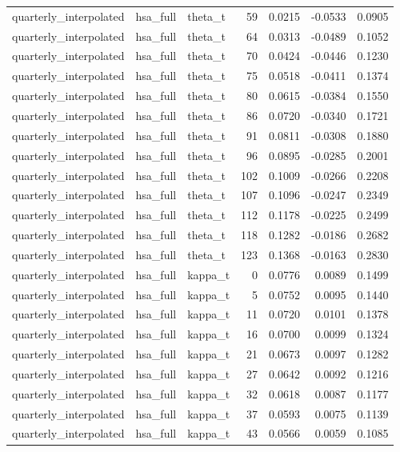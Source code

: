\begin{tabular}{lllrrrr}
quarterly\_interpolated & hsa\_full & theta\_t & 59 & 0.0215 & -0.0533 & 0.0905 \\
quarterly\_interpolated & hsa\_full & theta\_t & 64 & 0.0313 & -0.0489 & 0.1052 \\
quarterly\_interpolated & hsa\_full & theta\_t & 70 & 0.0424 & -0.0446 & 0.1230 \\
quarterly\_interpolated & hsa\_full & theta\_t & 75 & 0.0518 & -0.0411 & 0.1374 \\
quarterly\_interpolated & hsa\_full & theta\_t & 80 & 0.0615 & -0.0384 & 0.1550 \\
quarterly\_interpolated & hsa\_full & theta\_t & 86 & 0.0720 & -0.0340 & 0.1721 \\
quarterly\_interpolated & hsa\_full & theta\_t & 91 & 0.0811 & -0.0308 & 0.1880 \\
quarterly\_interpolated & hsa\_full & theta\_t & 96 & 0.0895 & -0.0285 & 0.2001 \\
quarterly\_interpolated & hsa\_full & theta\_t & 102 & 0.1009 & -0.0266 & 0.2208 \\
quarterly\_interpolated & hsa\_full & theta\_t & 107 & 0.1096 & -0.0247 & 0.2349 \\
quarterly\_interpolated & hsa\_full & theta\_t & 112 & 0.1178 & -0.0225 & 0.2499 \\
quarterly\_interpolated & hsa\_full & theta\_t & 118 & 0.1282 & -0.0186 & 0.2682 \\
quarterly\_interpolated & hsa\_full & theta\_t & 123 & 0.1368 & -0.0163 & 0.2830 \\
quarterly\_interpolated & hsa\_full & kappa\_t & 0 & 0.0776 & 0.0089 & 0.1499 \\
quarterly\_interpolated & hsa\_full & kappa\_t & 5 & 0.0752 & 0.0095 & 0.1440 \\
quarterly\_interpolated & hsa\_full & kappa\_t & 11 & 0.0720 & 0.0101 & 0.1378 \\
quarterly\_interpolated & hsa\_full & kappa\_t & 16 & 0.0700 & 0.0099 & 0.1324 \\
quarterly\_interpolated & hsa\_full & kappa\_t & 21 & 0.0673 & 0.0097 & 0.1282 \\
quarterly\_interpolated & hsa\_full & kappa\_t & 27 & 0.0642 & 0.0092 & 0.1216 \\
quarterly\_interpolated & hsa\_full & kappa\_t & 32 & 0.0618 & 0.0087 & 0.1177 \\
quarterly\_interpolated & hsa\_full & kappa\_t & 37 & 0.0593 & 0.0075 & 0.1139 \\
quarterly\_interpolated & hsa\_full & kappa\_t & 43 & 0.0566 & 0.0059 & 0.1085 \\

\end{tabular}
